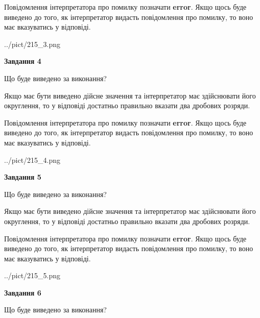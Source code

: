 \documentclass[12pt, ukrainian]{article}
\begin{document}
{\begin {Large}
Повідомлення інтерпретатора про помилку позначати \textbf{error}.
Якщо щось буде виведено до того, як інтерпретатор видасть повідомлення про помилку, 
то воно має вказуватись у відповіді. \par

\begin{center}
	{../pict/215_3.png}
\end{center}
\newpage

{\begin {center}\textbf{Завдання 4}\end {center}}\par
Що буде виведено за виконання? \par

Якщо має бути виведено дійсне значення та інтерпретатор має здійснювати його округлення, 
то у відповіді достатньо правильно вказати два дробових розряди.

Повідомлення інтерпретатора про помилку позначати \textbf{error}.
Якщо щось буде виведено до того, як інтерпретатор видасть повідомлення про помилку, 
то воно має вказуватись у відповіді. \par

\begin{center}
	{../pict/215_4.png}
\end{center}
\newpage

{\begin {center}\textbf{Завдання 5}\end {center}}\par
Що буде виведено за виконання? \par

Якщо має бути виведено дійсне значення та інтерпретатор має здійснювати його округлення, 
то у відповіді достатньо правильно вказати два дробових розряди.

Повідомлення інтерпретатора про помилку позначати \textbf{error}.
Якщо щось буде виведено до того, як інтерпретатор видасть повідомлення про помилку, 
то воно має вказуватись у відповіді. \par

\begin{center}
	{../pict/215_5.png}
\end{center}
\newpage

{\begin {center}\textbf{Завдання 6}\end {center}}\par
Що буде виведено за виконання? \par


\end{Large}}
\end{document}
